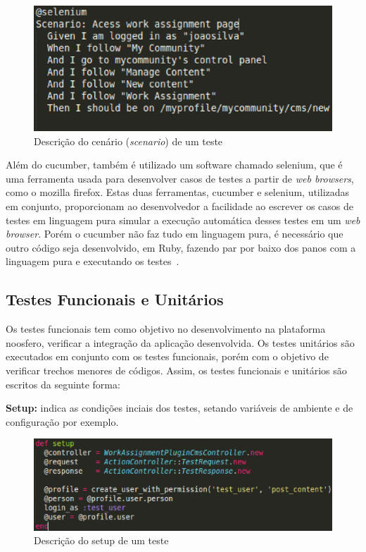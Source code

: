 \begin{enumerate}
\begin{figure}[!h]
    \centering
    \includegraphics[keepaspectratio=true,scale=0.50]
      {figuras/noosfero_scenario.eps}
    \caption{Descrição do cenário (\textit{scenario}) de um teste}
    \label{nosfero_scenario}
\end{figure}

\end{enumerate}

Além do cucumber, também é utilizado um software chamado selenium, que é uma ferramenta
usada para desenvolver casos de testes a partir de \textit{web browsers}, como o mozilla firefox. Estas duas ferramentas, cucumber e selenium, utilizadas em conjunto, proporcionam ao desenvolvedor a facilidade ao escrever os casos de testes em linguagem pura simular a execução automática desses testes em um \textit{web browser}. Porém o cucumber não faz tudo em linguagem pura, é necessário que outro código seja desenvolvido, em Ruby, fazendo par por baixo dos panos com a linguagem pura e executando os testes~\cite{akita2011}.

\subsection{Testes Funcionais e Unitários}
%
Os testes funcionais tem como objetivo no desenvolvimento na plataforma noosfero, verificar a integração da aplicação desenvolvida. Os testes unitários são executados em conjunto com os testes funcionais, porém  com o objetivo de verificar trechos menores de códigos. Assim, os testes funcionais e unitários são escritos da seguinte forma:

\textbf{Setup:} indica as condições inciais dos testes, setando variáveis de ambiente e de configuração por exemplo.

\begin{figure}[!h]
    \centering
    \includegraphics[keepaspectratio=true,scale=0.5]
      {figuras/teste_setup.eps}
    \caption{Descrição do setup de um teste}
    \label{nosfero_setup}
\end{figure}

